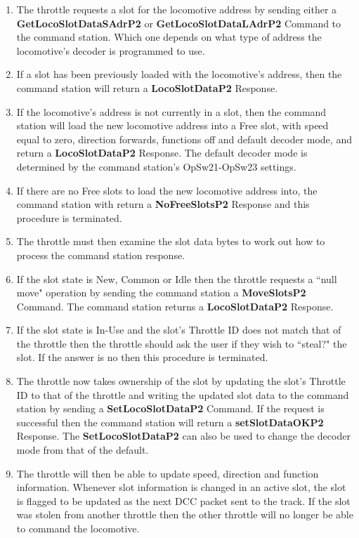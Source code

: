 \begin{enumerate}
\item The throttle requests a slot for the locomotive \gls{address} by sending either a \textbf{GetLocoSlotDataSAdrP2} or \textbf{GetLocoSlotDataLAdrP2} \gls{Command} to the command station. Which one depends on what type of address the locomotive's decoder is programmed to use. 
\item If a slot has been previously loaded with the locomotive's address, then the command station will return a \textbf{LocoSlotDataP2} \gls{Response}.
\item If the locomotive's address is not currently in a slot, then the command station will load the new locomotive address into a Free slot, with speed equal to zero, direction forwards, functions off and default decoder mode, and return a \textbf{LocoSlotDataP2} \gls{Response}. The default decoder mode is determined by the command station's OpSw21-OpSw23 settings.
\item If there are no Free slots to load the new locomotive address into, the command station with return a \textbf{NoFreeSlotsP2} \gls{Response} and this procedure is terminated.
\item The throttle must then examine the slot data bytes to work out how to process the command station response.
\item If the slot state is New, Common or Idle then the throttle requests a ``null move" operation by sending the command station a \textbf{MoveSlotsP2} \gls{Command}. The command station returns a \textbf{LocoSlotDataP2} \gls{Response}. 
\item If the slot state is In-Use and the slot's \gls{Throttle ID} does not match that of the throttle then the throttle should ask the user if they wish to ``steal?" the slot. If the answer is no then this procedure is terminated.
\item The throttle now takes ownership of the slot by updating the slot's Throttle ID to that of the throttle and writing the updated slot data to the command station by sending a \textbf{SetLocoSlotDataP2} \gls{Command}. If the request is successful then the command station will return a \textbf{setSlotDataOKP2} \gls{Response}. The \textbf{SetLocoSlotDataP2} can also be used to change the decoder mode from that of the default.
\item The throttle will then be able to update speed, direction and function information. Whenever slot information is changed in an active slot, the slot is flagged to be updated as the next DCC packet sent to the track. If the slot was stolen from another throttle then the other throttle will no longer be able to command the locomotive.
\end{enumerate}

